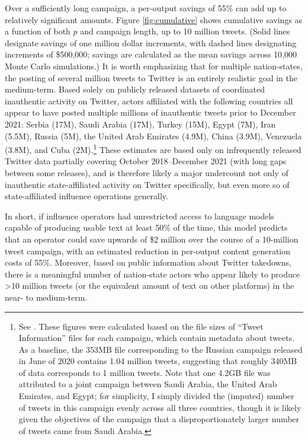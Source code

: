 \documentclass{article}
\begin{document}
Over a sufficiently long campaign, a per-output savings of 55\% can add up to relatively significant amounts. Figure \ref{fig:cumulative} shows cumulative savings as a function of both $p$ and campaign length, up to 10 million tweets. (Solid lines designate savings of one million dollar increments, with dashed lines designating increments of \$500,000; savings are calculated as the mean savings across 10,000  Monte Carlo simulations.) It is worth emphasizing that for multiple nation-states, the posting of several million tweets to Twitter is an entirely realistic goal in the medium-term. Based solely on publicly released datasets of coordinated inauthentic activity on Twitter, actors affiliated with the following countries all appear to have posted multiple millions of inauthentic tweets prior to December 2021: Serbia (17M), Saudi Arabia (17M), Turkey (15M), Egypt (7M), Iran (5.5M), Russia (5M), the United Arab Emirates (4.9M), China (3.9M), Venezuela (3.8M), and Cuba (2M).\footnote{See \cite{twitterops}. These figures were calculated based on the file sizes of ``Tweet Information'' files for each campaign, which contain metadata about tweets. As a baseline, the 353MB file corresponding to the Russian campaign released in June of 2020 contains 1.04 million tweets, suggesting that roughly 340MB of data corresponds to 1 million tweets. Note that one 4.2GB file was attributed to a joint campaign between Saudi Arabia, the United Arab Emirates, and Egypt; for simplicity, I simply divided the (imputed) number of tweets in this campaign evenly across all three countries, though it is likely given the objectives of the campaign that a disproportionately larger number of tweets came from Saudi Arabia.} These estimates are based only on infrequently released Twitter data partially covering October 2018–December 2021 (with long gaps between some releases), and is therefore likely a major undercount not only of inauthentic state-affiliated activity on Twitter specifically, but even more so of state-affiliated influence operations generally. 

In short, if influence operators had unrestricted access to language models capable of producing usable text at least 50\% of the time, this model predicts that an operator could save upwards of \$2 million over the course of a 10-million tweet campaign, with an estimated reduction in per-output content generation costs of 55\%. Moreover, based on public information about Twitter takedowns, there is a meaningful number of nation-state actors who appear likely to produce >10 million tweets (or the equivalent amount of text on other platforms) in the near- to medium-term.
\end{document}
